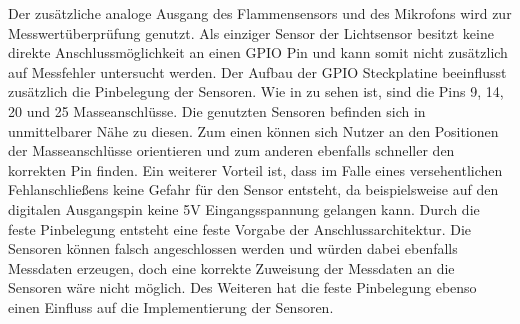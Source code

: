  Der zusätzliche analoge Ausgang des Flammensensors und des Mikrofons wird zur Messwertüberprüfung genutzt. Als einziger Sensor der Lichtsensor besitzt keine direkte Anschlussmöglichkeit an einen \ac{GPIO} Pin und kann somit nicht zusätzlich auf Messfehler untersucht werden. Der Aufbau der \ac{GPIO} Steckplatine beeinflusst zusätzlich die Pinbelegung der Sensoren. Wie in  zu sehen ist, sind die Pins 9, 14, 20 und 25 Masseanschlüsse. Die genutzten Sensoren befinden sich in unmittelbarer Nähe zu diesen. Zum einen können sich Nutzer an den Positionen der Masseanschlüsse orientieren und zum anderen ebenfalls schneller den korrekten Pin finden. Ein weiterer Vorteil ist, dass im Falle eines versehentlichen Fehlanschließens keine Gefahr für den Sensor entsteht, da beispielsweise auf den digitalen Ausgangspin keine 5V Eingangsspannung gelangen kann. Durch die feste Pinbelegung entsteht eine feste Vorgabe der Anschlussarchitektur. Die Sensoren können falsch angeschlossen werden und würden dabei ebenfalls Messdaten erzeugen, doch eine korrekte Zuweisung der Messdaten an die Sensoren wäre nicht möglich. Des Weiteren hat die feste Pinbelegung ebenso einen Einfluss auf die Implementierung der Sensoren. 
